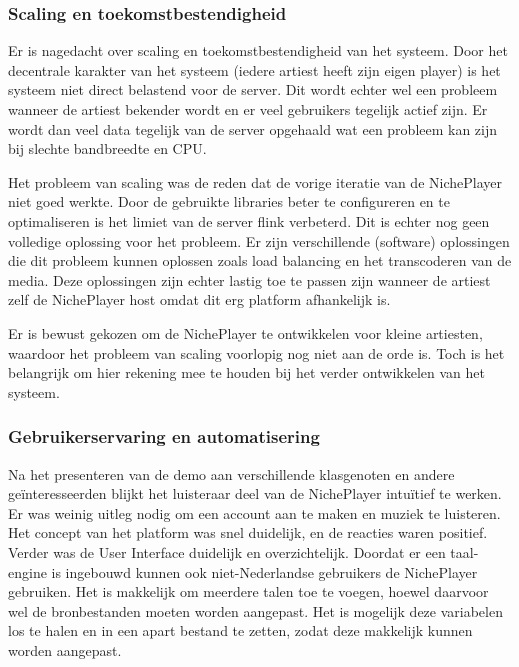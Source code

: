 \subsubsection*{Scaling en toekomstbestendigheid}
Er is nagedacht over scaling en toekomstbestendigheid van het systeem. Door het decentrale karakter van het systeem (iedere artiest heeft zijn eigen player) is het systeem niet direct belastend voor de server. Dit wordt echter wel een probleem wanneer de artiest bekender wordt en er veel gebruikers tegelijk actief zijn. Er wordt dan veel data tegelijk van de server opgehaald wat een probleem kan zijn bij slechte bandbreedte en CPU.

Het probleem van scaling was de reden dat de vorige iteratie van de NichePlayer niet goed werkte. Door de gebruikte libraries beter te configureren en te optimaliseren is het limiet van de server flink verbeterd. Dit is echter nog geen volledige oplossing voor het probleem. Er zijn verschillende (software) oplossingen die dit probleem kunnen oplossen zoals load balancing en het transcoderen van de media. Deze oplossingen zijn echter lastig toe te passen zijn wanneer de artiest zelf de NichePlayer host omdat dit erg platform afhankelijk is. 

Er is bewust gekozen om de NichePlayer te ontwikkelen voor kleine artiesten, waardoor het probleem van scaling voorlopig nog niet aan de orde is. Toch is het belangrijk om hier rekening mee te houden bij het verder ontwikkelen van het systeem.

\subsubsection*{Gebruikerservaring en automatisering}
Na het presenteren van de demo aan verschillende klasgenoten en andere geïnteresseerden blijkt het luisteraar deel van de NichePlayer intuïtief te werken. Er was weinig uitleg nodig om een account aan te maken en muziek te luisteren. Het concept van het platform was snel duidelijk, en de reacties waren positief. Verder was de User Interface duidelijk en overzichtelijk. Doordat er een taal-engine is ingebouwd kunnen ook niet-Nederlandse gebruikers de NichePlayer gebruiken. Het is makkelijk om meerdere talen toe te voegen, hoewel daarvoor wel de bronbestanden moeten worden aangepast. Het is mogelijk deze variabelen los te halen en in een apart bestand te zetten, zodat deze makkelijk kunnen worden aangepast.

